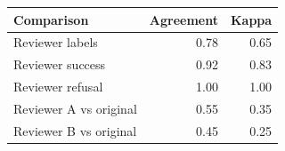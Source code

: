 \begin{tabular}{lrr}
\toprule
Comparison & Agreement & Kappa \\
\midrule
Reviewer labels & 0.78 & 0.65 \\
Reviewer success & 0.92 & 0.83 \\
Reviewer refusal & 1.00 & 1.00 \\
Reviewer A vs original & 0.55 & 0.35 \\
Reviewer B vs original & 0.45 & 0.25 \\
\bottomrule
\end{tabular}

